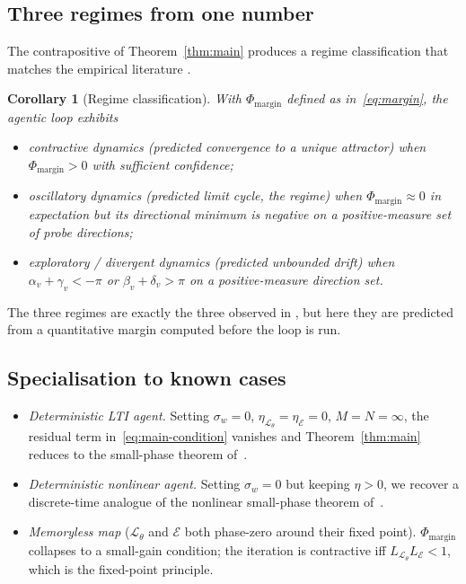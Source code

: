 \documentclass[11pt,a4paper]{article}
\newtheorem{corollary}[theorem]{Corollary}
\theoremstyle{definition}
\theoremstyle{remark}
\newcommand{\agent}{\mathcal{L}_{\theta}}
\newcommand{\env}{\mathcal{E}}
\newcommand{\PhaseMargin}{\Phi_{\mathrm{margin}}}
\begin{document}
\subsection{Three regimes from one number}\label{sec:regimes}

The contrapositive of Theorem~\ref{thm:main} produces a regime
classification that matches the empirical literature
\citep{Tacheny2025AgenticLoops,Wang2025AttractorCycles,Cemri2025MAST}.

\begin{corollary}[Regime classification]\label{c:regimes}
With $\PhaseMargin$ defined as in~\eqref{eq:margin}, the agentic loop
exhibits
\begin{itemize}[leftmargin=*]
\item \emph{contractive} dynamics (predicted convergence to a unique
attractor) when $\PhaseMargin>0$ with sufficient confidence;
\item \emph{oscillatory} dynamics (predicted limit cycle, the
\citet{Wang2025AttractorCycles} regime) when $\PhaseMargin\approx 0$ in
expectation but its directional minimum is negative on a positive-measure
set of probe directions;
\item \emph{exploratory} / \emph{divergent} dynamics (predicted
unbounded drift) when
$\alpha_{v}+\gamma_{v}<-\pi$ or $\beta_{v}+\delta_{v}>\pi$ on a
positive-measure direction set.
\end{itemize}
\end{corollary}

The three regimes are exactly the three observed in
\citet{Tacheny2025AgenticLoops}, but here they are predicted from a
quantitative margin computed before the loop is run.

\subsection{Specialisation to known cases}\label{sec:specialisations}

\begin{itemize}[leftmargin=*]
\item \emph{Deterministic LTI agent.}  Setting $\sigma_{w}=0$,
$\eta_{\agent}=\eta_{\env}=0$, $M=N=\infty$, the residual term
in~\eqref{eq:main-condition} vanishes and Theorem~\ref{thm:main} reduces
to the small-phase theorem of~\citet{Chen2023PhaseTheory}.
\item \emph{Deterministic nonlinear agent.}  Setting $\sigma_{w}=0$ but
keeping $\eta>0$, we recover a discrete-time analogue of the nonlinear
small-phase theorem of~\citet{Chen2021PhaseNonlinear}.
\item \emph{Memoryless map} ($\agent$ and $\env$ both phase-zero around
their fixed point).  $\PhaseMargin$ collapses to a small-gain
condition; the iteration is contractive iff $L_{\agent}L_{\env}<1$, which
is the \citet{BanachFixedPoint1922} fixed-point principle.
\end{itemize}
\end{document}
